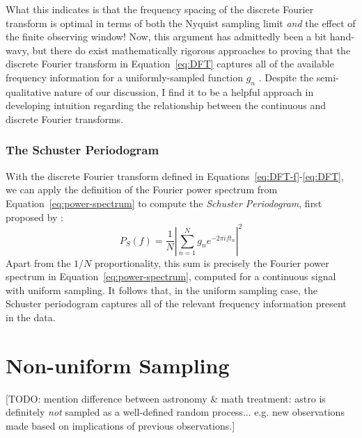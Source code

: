 \documentclass[preprint]{aastex}
\newcommand{\todo}[1]{{\color{red} [TODO: #1]}}
\newcommand{\Eq}[1]{Equation~\ref{eq:#1}}
\newcommand{\eq}[1]{\Eq{#1}}
\newcommand{\eqs}[2]{Equations~\ref{eq:#1}-\ref{eq:#2}}
\newcommand{\eqlabel}[1]{\label{eq:#1}}
\newcommand{\sectlabel}[1]{\label{sect:#1}}
\begin{document}
What this indicates is that the frequency spacing of the discrete Fourier
transform is optimal in terms of both the Nyquist sampling limit
{\it and} the effect of the finite observing window!
Now, this argument has admittedly been a bit hand-wavy, but there do exist
mathematically rigorous approaches to proving that the discrete Fourier
transform in \eq{DFT} captures all of the available frequency information
for a uniformly-sampled function $g_n$
\citep[see, e.g.][]{FoundationsOfSignalProcessing}.
Despite the semi-qualitative nature of our discussion,
I find it to be a helpful approach
in developing intuition regarding the relationship between the
continuous and discrete Fourier transforms.

\subsubsection{The Schuster Periodogram}

With the discrete Fourier transform defined in \eqs{DFT-f}{DFT}, we can
apply the definition of the Fourier power spectrum from \eq{power-spectrum}
to compute the {\it Schuster Periodogram}, first proposed by \citet{Schuster98}:
\begin{equation}
  P_S(f) = \frac{1}{N}\left|\sum_{n=1}^N g_n e^{-2\pi i f t_n}\right|^2
  \eqlabel{schuster-periodogram}
\end{equation}
Apart from the $1/N$ proportionality, this sum is precisely the Fourier power
spectrum in \eq{power-spectrum}, computed for a continuous signal with
uniform sampling.
It follows that, in the uniform sampling case, the Schuster periodogram captures
all of the relevant frequency information present in the data.


\section{Non-uniform Sampling}
\sectlabel{non-uniform-sampling}

\todo{mention difference between astronomy \& math treatment: astro is definitely {\it not} sampled as a well-defined random process... e.g. new observations made based on implications of previous observations.}
\end{document}

